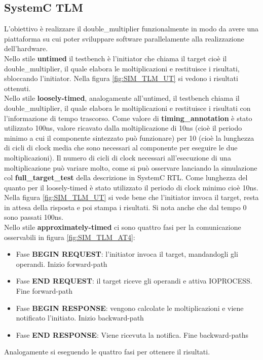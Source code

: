 \documentclass[]{IEEEtran}
\begin{document}
\subsection{SystemC TLM}
L'obiettivo è realizzare il double\_multiplier funzionalmente in modo da avere una piattaforma su cui poter sviluppare software parallelamente alla realizzazione dell'hardware.
\\Nello stile \textbf{untimed} il testbench è l'initiator che chiama il target cioè il double\_multiplier, il quale elabora le moltiplicazioni e restituisce i risultati, sbloccando l'initiator. Nella figura \ref{fig:SIM_TLM_UT} si vedono i risultati ottenuti.
\\Nello stile \textbf{loosely-timed}, analogamente all'untimed, il testbench chiama il double\_multiplier, il quale elabora le moltiplicazioni e restituisce i risultati con l'informazione di tempo trascorso. Come valore di \textbf{timing\_annotation} è stato utilizzato 100ns, valore ricavato dalla moltiplicazione di 10ns (cioè il periodo minimo a cui il componente sintezzato può funzionare) per 10 (cioè la lunghezza di cicli di clock media che sono necessari al componente per eseguire le due moltiplicazioni). Il numero di cicli di clock necessari all'esecuzione di una moltiplicazione può variare molto, come si può osservare lanciando la simulazione col \textbf{full\_target\_test} della descrizione in SystemC RTL. Come lunghezza del quanto per il loosely-timed è stato utilizzato il periodo di clock minimo cioè 10ns. Nella figura \ref{fig:SIM_TLM_UT} si vede bene che l'initiator invoca il target, resta in attesa della risposta e poi stampa i risultati. Si nota anche che dal tempo 0 sono passati 100ns.
\\Nello stile \textbf{approximately-timed} ci sono quattro fasi per la comunicazione osservabili in figura \ref{fig:SIM_TLM_AT4}:
\begin{itemize}
    \item Fase \textbf{BEGIN REQUEST}: l'initiator invoca il target, mandandogli gli operandi. Inizio forward-path
    \item Fase \textbf{END REQUEST}: il target riceve gli operandi e attiva IOPROCESS. Fine forward-path
    \item Fase \textbf{BEGIN RESPONSE}: vengono calcolate le moltiplicazioni e viene notificato l'initiato. Inizio backward-path
    \item Fase \textbf{END RESPONSE}: Viene ricevuta la notifica. Fine backward-paths
\end{itemize}
Analogamente si eseguendo le quattro fasi per ottenere il risultati.
\end{document}
